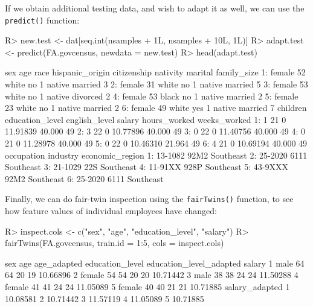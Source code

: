 \documentclass[
  notitle]{jss}
\begin{document}
If we obtain additional testing data, and wish to adapt it as well, we
can use the \texttt{predict()} function:

\begin{CodeChunk}
\begin{CodeInput}
R> new.test <- dat[seq.int(nsamples + 1L, nsamples + 10L, 1L)]
R> adapt.test <- predict(FA.govcensus, newdata = new.test)
R> head(adapt.test)
\end{CodeInput}
\begin{CodeOutput}
      sex age  race hispanic_origin citizenship nativity  marital family_size
1: female  52 white              no           1   native  married           3
2: female  31 white              no           1   native  married           5
3: female  53 white              no           1   native divorced           2
4: female  53 black              no           1   native  married           2
5: female  23 white              no           1   native  married           2
6: female  49 white             yes           1   native  married           7
   children education_level english_level   salary hours_worked weeks_worked
1:        1              21             0 11.91839       40.000           49
2:        3              22             0 10.77896       40.000           49
3:        0              22             0 11.40756       40.000           49
4:        0              21             0 11.28978       40.000           49
5:        0              22             0 10.46310       21.964           49
6:        4              21             0 10.69194       40.000           49
   occupation industry economic_region
1:    13-1082     92M2       Southeast
2:    25-2020     6111       Southeast
3:    21-1029      22S       Southeast
4:    11-91XX     928P       Southeast
5:    43-9XXX     92M2       Southeast
6:    25-2020     6111       Southeast
\end{CodeOutput}
\end{CodeChunk}

Finally, we can do fair-twin inspection using the \texttt{fairTwins()}
function, to see how feature values of individual employees have
changed:

\begin{CodeChunk}
\begin{CodeInput}
R> inspect.cols <- c("sex", "age", "education_level", "salary")
R> fairTwins(FA.govcensus, train.id = 1:5, cols = inspect.cols)
\end{CodeInput}
\begin{CodeOutput}
     sex age age_adapted education_level education_level_adapted   salary
1   male  64          64              20                      19 10.66896
2 female  54          54              20                      20 10.71442
3   male  38          38              24                      24 11.50288
4 female  41          41              24                      24 11.05089
5 female  40          40              21                      21 10.71885
  salary_adapted
1       10.08581
2       10.71442
3       11.57119
4       11.05089
5       10.71885
\end{CodeOutput}
\end{CodeChunk}
\end{document}
